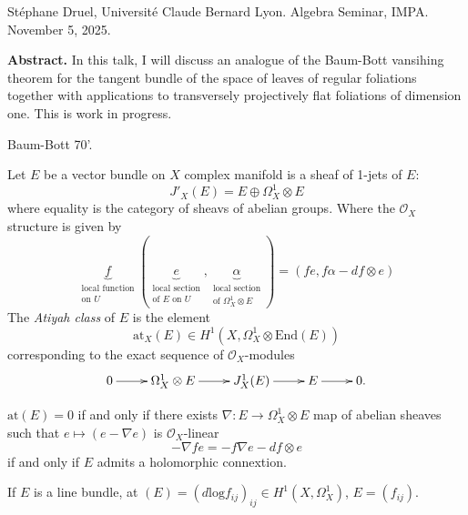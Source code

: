 \noindent
Stéphane Druel, Université Claude Bernard
Lyon.
Algebra Seminar, IMPA.
November 5, 2025.

\medskip\noindent
{\bf Abstract.}
In this talk, I will discuss an analogue of
the Baum-Bott vansihing theorem for
the tangent bundle of the space of leaves of
regular foliations together with
applications to transversely projectively
flat foliations of dimension one. This
is work in progress.

\medskip\noindent



Baum-Bott 70'.

Let $E$ be a vector bundle on $X$
complex manifold is a sheaf of 1-jets of $E$:
$$
J'_X(E)= E \oplus \Omega^1_X \otimes E
$$
where equality is the category of sheavs of
abelian groups.
Where the $\mathcal{O}_X$ structure is given
by
$$
\underbrace{f}_{\substack{\text{local
function} \\ \text{on }U}}
(\underbrace{e}_{\substack{\text{local
section} \\ \text{of $E$ on  $U$}}}
, \underbrace{\alpha}_{\substack{\text{local
section} \\
\text{of $\Omega^1_X \otimes E$}}})
=(fe,f\alpha-df \otimes e)
$$
The {\it Atiyah class} of $E$ is the element
$$
\text{at}_X(E) \in H^1(X,\Omega_X^1 \otimes
\text{End}(E))
$$
corresponding to the exact sequence of
$\mathcal{O}_X$-modules
$$
\xymatrix{
0\ar[r]&\Omega_X^1\otimes
E\ar[r]&J_X^1(E)\ar[r]&E\ar[r]&0.
}
$$

\begin{remark}
\label{remark-holomorphic-connection}
 $\text{at}(E)=0$ if and only if there exists
$\nabla:E \to \Omega^1_X \otimes E$ map of
abelian sheaves
such that $e \mapsto  (e-\nabla e)$ is
$\mathcal{O}_X$-linear
$$
-\nabla fe=-f\nabla e - df \otimes e
$$
if and only if $E$ admits a holomorphic
connextion.
\end{remark}

\begin{example}
\label{example-line-bundl-holom-conne}
If $E$ is a line bundle, at
$(E)=(d\text{log}f_{ij})_{ij}
\in H^1(X,\Omega_X^1)$, $E=(f_{ij})$.
\end{example}

